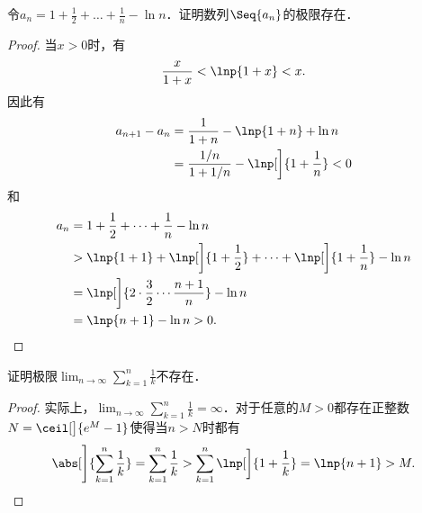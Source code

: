 \begin{example*}
  令\(\displaystyle a_n = 1 + \frac12 + \dots + \frac1n - \ln n\)．证明数列\(\Seq{a_n}\)的极限存在．\rule{0ex}{3.5ex}

  \begin{proof}
    当\(x > 0\)时，有
    \begin{equation*}
      \frac{x}{1+x} < \lnp{1+x} < x.
    \end{equation*}
    因此有
    \begin{align*}
      a_{n+1} - a_n
      &= \frac{1}{1+n} - \lnp{1+n} + \ln n \\
      &= \frac{1/n}{1+1/n} - \lnp[\bigg]{1+\frac1n} < 0
    \end{align*}
    和
    \begin{align*}
      a_n
      &= 1 + \frac12 + \dots + \frac1n - \ln n \\
      &> \lnp{1+1} + \lnp[\bigg]{1+\frac12} + \dots + \lnp[\bigg]{1+\frac1n} - \ln n \\
      &= \lnp[\bigg]{2 \cdot \frac32 \dotsm \frac{n+1}{n}} - \ln n \\
      &= \lnp{n + 1} - \ln n > 0. \qedhere
    \end{align*}
  \end{proof}
\end{example*}

\begin{example*}
  证明极限\(\displaystyle \lim_{n\to\infty} \sum_{k=1}^n \frac1k\)不存在．

  \begin{proof}
    实际上，\(\displaystyle \lim_{n\to\infty} \sum_{k=1}^n \frac1k = \infty\)．对于任意的\(M > 0\)都存在正整数\(N = \ceil[\big]{e^M-1}\)使得当\(n > N\)时都有
    \begin{equation*}
      \abs[\Bigg]{\sum_{k=1}^n \frac1k}
      = \sum_{k=1}^n \frac1k
      > \sum_{k=1}^n \lnp[\bigg]{1+\frac1k}
      = \lnp{n+1} > M.
      \qedhere
    \end{equation*}
  \end{proof}
\end{example*}

